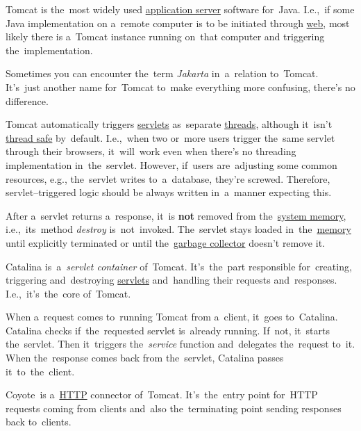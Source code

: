 \label{tomcat}
Tomcat is the~most widely used \hyperref[applicationserver]{application server} software for~Java.
I.e.,~if some Java implementation on a~remote computer is to be initiated through \hyperref[internetweb]{web}, most likely there is a~Tomcat instance running on~that computer and triggering the~implementation.

\warning Sometimes you can encounter the~term \textit{Jakarta} in~a~relation to~Tomcat.
It's~just another name for~Tomcat to~make everything more confusing, there's no difference.

Tomcat automatically triggers \hyperref[servlet]{servlets} as~separate \hyperref[javathread]{threads}, although it~isn't \hyperref[javathreadsafety]{thread safe} by~default.
I.e.,~when two or~more users trigger the~same servlet through their browsers, it~will~work even when there's no threading implementation in~the~servlet.
However, if~users are~adjusting some common resources, e.g., the~servlet writes to~a~database, they're screwed.
Therefore, servlet--triggered logic should be always written in~a~manner expecting this.

\warning After a~servlet returns a~response, it~is \textbf{not} removed from the~\hyperref[systemmemory]{system memory}, i.e.,~its~method \textit{destroy} is~not~invoked.
The~servlet stays loaded in~the~\hyperref[systemmemory]{memory} until explicitly terminated or until the~\hyperref[garbagecollector]{garbage collector} doesn't remove it.

Catalina is~a~\textit{servlet container} of~Tomcat.
It's~the~part responsible for~creating, triggering and~destroying \hyperref[servlet]{servlets} and~handling their requests and~responses.
I.e.,~it's~the~core of~Tomcat.

When a~request comes to~running Tomcat from a~client, it~goes to~Catalina.
Catalina checks if~the~requested servlet is~already running.
If~not, it~starts the~servlet.
Then it~triggers the~\textit{service} function and~delegates the~request to~it.
When the~response comes back from the~servlet, Catalina passes it~to~the~client.
\newpage

\label{coyote}
Coyote~is a~\hyperref[http]{HTTP} connector of~Tomcat.
It's~the~entry point for~HTTP requests coming from clients and~also the~terminating point sending responses back to~clients.

